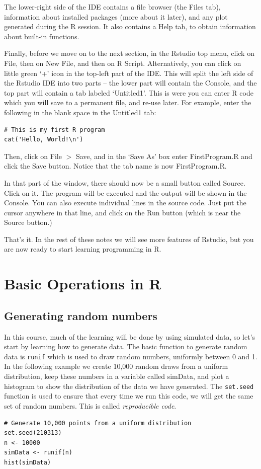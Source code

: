 \documentclass[11pt]{article}
\theoremstyle{definition}
\begin{document}
The lower-right side of the IDE contains a file browser (the Files tab), information about installed packages (more about it later), and any plot generated during the R session. It also contains a Help tab, to obtain information about built-in functions.

Finally, before we move on to the next section, in the Rstudio top menu, click on File, then on New File, and then on R Script. Alternatively, you can click on little green `+' icon in the top-left part of the IDE. This will split the left side of the Rstudio IDE into two parts -- the lower part will contain the Console, and the top part will contain a tab labeled `Untitled1'. This is were you can enter R code which you will save to a permanent file, and re-use later.
For example, enter the following in the blank space in the Untitled1 tab:
\begin{tcolorbox}[colback=gray!20,boxrule=0pt,frame hidden]
\begin{verbatim}
# This is my first R program
cat('Hello, World!\n')
\end{verbatim}
\end{tcolorbox}
Then, click on File $>$ Save, and in the `Save As' box enter FirstProgram.R and click the Save button.
Notice that the tab name is now FirstProgram.R.

In that part of the window, there should now be a small button called Source. Click on it. The program will be executed and the output will be shown in the Console. You can also execute individual lines in the source code. Just put the cursor anywhere in that line, and click on the Run button (which is near the Source button.)

That's it. In the rest of these notes we will see more features of Rstudio, but you are now ready to start learning programming in R.

\section{Basic Operations in R}
\subsection{Generating random numbers}
In this course, much of the learning will be done by using simulated data, so let's start by learning how to generate data. The basic function to generate random data is \texttt{runif} which is used to draw random numbers, uniformly between 0 and 1. In the following example we create 10,000 random draws from a uniform distribution, keep these numbers in a variable called simData, and plot a histogram to show the distribution of the data we have generated. The \texttt{set.seed} function is used to ensure that every time we run this code, we will get the same set of random numbers. This is called \textit{reproducible code}. 
\begin{verbatim}
# Generate 10,000 points from a uniform distribution
set.seed(210313)
n <- 10000
simData <- runif(n)
hist(simData)
\end{verbatim}
\end{document}
